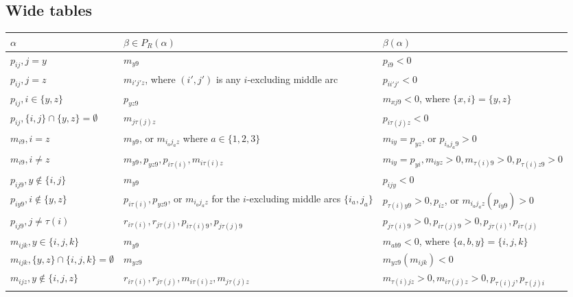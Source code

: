 \documentclass[10pt,a4paper]{amsart}
\numberwithin{equation}{section}
\newcommand{\al}{\alpha}
\newcommand{\be}{\beta}
\newcommand{\pra}{P_R(\al)}
\begin{document}
\appendix
\begin{landscape}
%
\section{Wide tables}
\label{sec:wide_tables}

\begin{table}[b]
      \centering
\begin{tabular}{@{}lll@{}}
\toprule
  $\al$ & $\be\in \pra$ & $\be(\al)$ \\
  \midrule
  $p_{ij}, j=y$ & $m_{y9}$  & $p_{i9}<0$ \\
  $p_{ij}, j=z$ & $m_{i'j'z}$, where $(i',j')$ is any $i$-excluding middle arc& $p_{ii'j'}<0$ \\
  $p_{ij}, i\in \{y,z\}$ & $p_{yz9}$ & $m_{xj9}<0$, where $\{x,i\}=\{y,z\}$ \\
  $p_{ij}, \{i,j\}\cap\{y,z\}=\emptyset$ & $m_{j\tau(j)z}$ & $p_{i\tau(j)z}<0$\\
  \midrule
  $m_{i9}, i=z$ & $m_{y9}$, or $m_{i_aj_az}$ where $a\in \{1,2,3\}$ &
  $m_{iy}=p_{yz}$, or $p_{i_aj_a9}>0$ \\
  $m_{i9}, i\neq z$ & $m_{y9}, p_{yz9}, p_{i\tau(i)}, m_{i\tau(i)z}$ &
$m_{iy}=p_{yi}, m_{iyz}>0, m_{\tau(i)9}>0, p_{\tau(i)z9}>0$ \\
  \midrule
  $p_{ij9}, y\notin \{i,j\}$ & $m_{y9}$ & $p_{ijy}<0$\\
  $p_{iy9}, i\notin \{y,z\}$ & $p_{i\tau(i)}, p_{yz9}$, or $m_{i_aj_az}$ for the
   $i$-excluding middle arcs $\{i_a,j_a\}$  & $p_{\tau(i)y9}>0, p_{iz}$, or $m_{i_aj_az}(p_{iy9})>0$\\
  $p_{ij9}, j\neq \tau(i)$& $r_{i\tau(i)}, r_{j\tau(j)}, p_{i\tau(i)9},
  p_{j\tau(j)9}$   & $p_{j\tau(i)9}>0, p_{i\tau(j)9}>0, p_{j\tau(i)}, p_{i\tau(j)}$ \\ 
  \midrule
  $m_{ijk}, y\in \{i,j,k\}$ & $m_{y9}$ & $m_{ab9}<0$, where
  $\{a,b,y\}=\{i,j,k\}$\\
  $m_{ijk}, \{y,z\}\cap \{i,j,k\}=\emptyset$ & $m_{yz9}$ & $m_{yz9}(m_{ijk})<0$\\
  $m_{ijz}, y\notin \{i,j,z\}$ & $r_{i\tau(i)}, r_{j\tau(j)}, m_{i\tau(i)z},
  m_{j\tau(j)z}$ & $m_{\tau(i)jz}>0, m_{i\tau(j)z}>0, p_{\tau(i)j},
  p_{\tau(j)i}$\\
  \bottomrule

\end{tabular}
\end{table}
\end{landscape}
\end{document}
